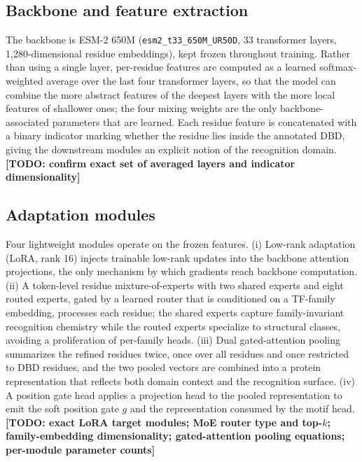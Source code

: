\documentclass[11pt]{article}
\newcommand{\TODO}[1]{{\color{red}\textbf{[TODO: #1]}}}
\begin{document}
\subsection*{Backbone and feature extraction}
The backbone is ESM-2 650M (\texttt{esm2\_t33\_650M\_UR50D}, 33 transformer layers,
1{,}280-dimensional residue embeddings)\cite{lin2023esm2}, kept frozen throughout
training. Rather than using a single layer, per-residue features are computed as a
learned softmax-weighted average over the last four transformer layers, so that the
model can combine the more abstract features of the deepest layers with the more local
features of shallower ones; the four mixing weights are the only backbone-associated
parameters that are learned. Each residue feature is concatenated with a binary
indicator marking whether the residue lies inside the annotated DBD, giving the
downstream modules an explicit notion of the recognition domain.
\TODO{confirm exact set of averaged layers and indicator dimensionality}

\subsection*{Adaptation modules}
Four lightweight modules operate on the frozen features. (i) Low-rank adaptation
(LoRA, rank 16)\cite{hu2022lora} injects trainable low-rank updates into the backbone
attention projections, the only mechanism by which gradients reach backbone
computation. (ii) A token-level residue mixture-of-experts\cite{shazeer2017outrageously,fedus2022switch}
with two shared experts and eight routed experts, gated by a learned router that is
conditioned on a TF-family embedding, processes each residue; the shared experts capture family-invariant
recognition chemistry while the routed experts specialize to structural classes,
avoiding a proliferation of per-family heads. (iii) Dual gated-attention pooling
summarizes the refined residues twice, once over all residues and once restricted to
DBD residues, and the two pooled vectors are combined into a protein representation
that reflects both domain context and the recognition surface. (iv) A position gate
head applies a projection head to the pooled representation to emit the soft position
gate $g$ and the representation consumed by the motif head.
\TODO{exact LoRA target modules; MoE router type and top-$k$; family-embedding
dimensionality; gated-attention pooling equations; per-module parameter counts}
\end{document}
